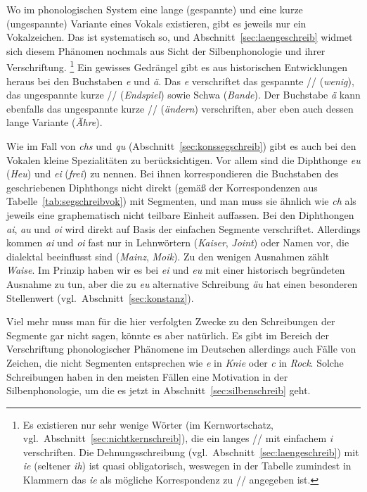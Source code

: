 Wo im phonologischen System eine lange (gespannte) und eine kurze (ungespannte) Variante eines Vokals existieren, gibt es jeweils nur ein Vokalzeichen.
Das ist systematisch so, und Abschnitt~\ref{sec:laengeschreib} widmet sich diesem Phänomen nochmals aus Sicht der Silbenphonologie und ihrer Verschriftung.%
\footnote{Es existieren nur sehr wenige Wörter (im Kernwortschatz, vgl.\ Abschnitt~\ref{sec:nichtkernschreib}), die ein langes // mit einfachem \textit{i} verschriften.
Die Dehnungsschreibung (vgl.\ Abschnitt~\ref{sec:laengeschreib}) mit \textit{ie} (seltener \textit{ih}) ist quasi obligatorisch, weswegen in der Tabelle zumindest in Klammern das \textit{ie} als mögliche Korrespondenz zu // angegeben ist.}
Ein gewisses Gedrängel gibt es aus historischen Entwicklungen heraus bei den Buchstaben \textit{e} und \textit{ä}.
Das \textit{e} verschriftet das gespannte // (\textit{wenig}), das ungespannte kurze // (\textit{Endspiel}) sowie Schwa (\textit{Bande}).
Der Buchstabe \textit{ä} kann ebenfalls das ungespannte kurze // (\textit{ändern}) verschriften, aber eben auch dessen lange Variante (\textit{Ähre}).

\newpage

Wie im Fall von \textit{chs} und \textit{qu} (Abschnitt~\ref{sec:konssegschreib}) gibt es auch bei den Vokalen kleine Spezialitäten zu berücksichtigen.
Vor allem sind die Diphthonge \textit{eu} (\textit{Heu}) und \textit{ei} (\textit{frei}) zu nennen.
Bei ihnen korrespondieren die Buchstaben des geschriebenen Diphthongs nicht direkt (gemäß der Korrespondenzen aus Tabelle~\ref{tab:segschreibvok}) mit Segmenten, und man muss sie ähnlich wie \textit{ch} als jeweils eine graphematisch nicht teilbare Einheit auffassen.
Bei den Diphthongen \textit{ai}, \textit{au} und \textit{oi} wird direkt auf Basis der einfachen Segmente verschriftet.
Allerdings kommen \textit{ai} und \textit{oi} fast nur in Lehnwörtern (\textit{Kaiser}, \textit{Joint}) oder Namen vor, die dialektal beeinflusst sind (\textit{Mainz}, \textit{Moik}).
Zu den wenigen Ausnahmen zählt \textit{Waise}.
Im Prinzip haben wir es bei \textit{ei} und \textit{eu} mit einer historisch begründeten Ausnahme zu tun, aber die zu \textit{eu} alternative Schreibung \textit{äu} hat einen besonderen Stellenwert (vgl.\ Abschnitt~\ref{sec:konstanz}).

Viel mehr muss man für die hier verfolgten Zwecke zu den Schreibungen der Segmente gar nicht sagen, könnte es aber natürlich.
Es gibt im Bereich der Verschriftung phonologischer Phänomene im Deutschen allerdings auch Fälle von Zeichen, die nicht Segmenten entsprechen wie \textit{e} in \textit{Knie} oder \textit{c} in \textit{Rock}.
Solche Schreibungen haben in den meisten Fällen eine Motivation in der Silbenphonologie, um die es jetzt in Abschnitt~\ref{sec:silbenschreib} geht.

